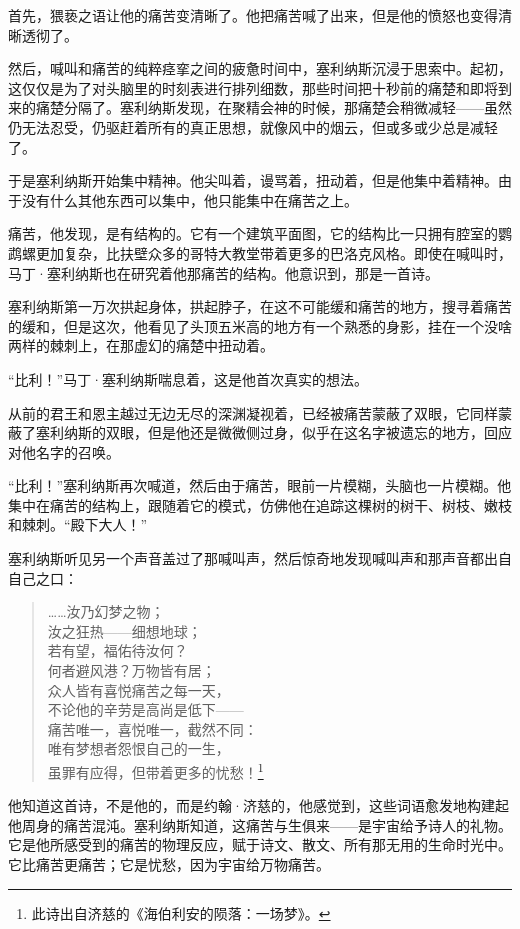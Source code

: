 \documentclass[AutoFakeBold=true]{book}
\begin{document}
首先，猥亵之语让他的痛苦变清晰了。他把痛苦喊了出来，但是他的愤怒也变得清晰透彻了。

然后，喊叫和痛苦的纯粹痉挛之间的疲惫时间中，塞利纳斯沉浸于思索中。起初，这仅仅是为了对头脑里的时刻表进行排列细数，那些时间把十秒前的痛楚和即将到来的痛楚分隔了。塞利纳斯发现，在聚精会神的时候，那痛楚会稍微减轻——虽然仍无法忍受，仍驱赶着所有的真正思想，就像风中的烟云，但或多或少总是减轻了。

于是塞利纳斯开始集中精神。他尖叫着，谩骂着，扭动着，但是他集中着精神。由于没有什么其他东西可以集中，他只能集中在痛苦之上。

痛苦，他发现，是有结构的。它有一个建筑平面图，它的结构比一只拥有腔室的鹦鹉螺更加复杂，比扶壁众多的哥特大教堂带着更多的巴洛克风格。即使在喊叫时，马丁·塞利纳斯也在研究着他那痛苦的结构。他意识到，那是一首诗。

塞利纳斯第一万次拱起身体，拱起脖子，在这不可能缓和痛苦的地方，搜寻着痛苦的缓和，但是这次，他看见了头顶五米高的地方有一个熟悉的身影，挂在一个没啥两样的棘刺上，在那虚幻的痛楚中扭动着。

``比利！''马丁·塞利纳斯喘息着，这是他首次真实的想法。

从前的君王和恩主越过无边无尽的深渊凝视着，已经被痛苦蒙蔽了双眼，它同样蒙蔽了塞利纳斯的双眼，但是他还是微微侧过身，似乎在这名字被遗忘的地方，回应对他名字的召唤。

``比利！''塞利纳斯再次喊道，然后由于痛苦，眼前一片模糊，头脑也一片模糊。他集中在痛苦的结构上，跟随着它的模式，仿佛他在追踪这棵树的树干、树枝、嫩枝和棘刺。``殿下大人！''

塞利纳斯听见另一个声音盖过了那喊叫声，然后惊奇地发现喊叫声和那声音都出自自己之口：

\begin{quote}
	{\kaishu ……汝乃幻梦之物；\\
	汝之狂热——细想地球；\\
	若有望，福佑待汝何？\\
	何者避风港？万物皆有居；\\
	众人皆有喜悦痛苦之每一天，\\
	不论他的辛劳是高尚是低下——\\
	痛苦唯一，喜悦唯一，截然不同：\\
	唯有梦想者怨恨自己的一生，\\
	虽罪有应得，但带着更多的忧愁！}\footnote{此诗出自济慈的《海伯利安的陨落：一场梦》。}
\end{quote}

他知道这首诗，不是他的，而是约翰·济慈的，他感觉到，这些词语愈发地构建起他周身的痛苦混沌。塞利纳斯知道，这痛苦与生俱来——是宇宙给予诗人的礼物。它是他所感受到的痛苦的物理反应，赋于诗文、散文、所有那无用的生命时光中。它比痛苦更痛苦；它是忧愁，因为宇宙给万物痛苦。
\end{document}
